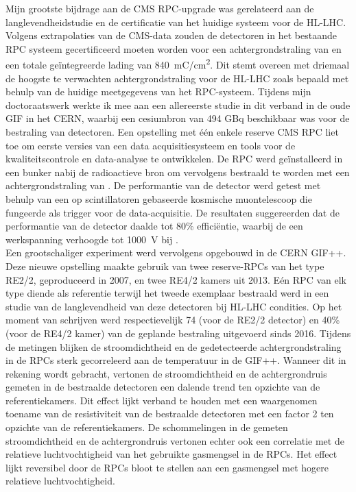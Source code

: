 	Mijn grootste bijdrage aan de CMS RPC-upgrade was gerelateerd aan de langlevendheidstudie en de certificatie van het huidige systeem voor de HL-LHC. Volgens extrapolaties van de CMS-data zouden de detectoren in het bestaande RPC systeem gecertificeerd moeten worden voor een achtergrondstraling van  en een totale geïntegreerde lading van \SI{840}{mC/cm^2}. Dit stemt overeen met driemaal de hoogste te verwachten achtergrondstraling voor de HL-LHC zoals bepaald met behulp van de huidige meetgegevens van het RPC-systeem. Tijdens mijn doctoraatswerk werkte ik mee aan een allereerste studie in dit verband in de oude GIF in het CERN, waarbij een cesiumbron van 494 GBq beschikbaar was voor de bestraling van detectoren. Een opstelling met \'e\'en enkele reserve CMS RPC liet toe om eerste versies van een data acquisitiesysteem en tools voor de kwaliteitscontrole en data-analyse te ontwikkelen. De RPC werd geïnstalleerd in een bunker nabij de radioactieve bron om vervolgens bestraald te worden met een achtergrondstraling van . De performantie van de detector werd getest met behulp van een op scintillatoren gebaseerde kosmische muontelescoop die fungeerde als trigger voor de data-acquisitie. De resultaten suggereerden dat de performantie van de detector daalde tot 80\% efficiëntie, waarbij de een werkspanning verhoogde tot \SI{1000}{V} bij .\\
	Een grootschaliger experiment werd vervolgens opgebouwd in de CERN GIF++. Deze nieuwe opstelling maakte gebruik van twee reserve-RPCs van het type RE2/2, geproduceerd in 2007, en twee RE4/2 kamers uit 2013. Eén RPC van elk type diende als referentie terwijl het tweede exemplaar bestraald werd in een studie van de langlevendheid van deze detectoren bij HL-LHC condities. Op het moment van schrijven werd respectievelijk 74 (voor de RE2/2 detector) en 40\% (voor de RE4/2 kamer) van de geplande bestraling uitgevoerd sinds 2016. Tijdens de metingen blijken de stroomdichtheid en de gedetecteerde achtergrondstraling in de RPCs sterk gecorreleerd aan de temperatuur in de GIF++. Wanneer dit in rekening wordt gebracht, vertonen de stroomdichtheid en de achtergrondruis gemeten in de bestraalde detectoren een dalende trend ten opzichte van de referentiekamers. Dit effect lijkt verband te houden met een waargenomen toename van de resistiviteit van de bestraalde detectoren met een factor 2 ten opzichte van de referentiekamers. De schommelingen in de gemeten stroomdichtheid en de achtergrondruis vertonen echter ook een correlatie met de relatieve luchtvochtigheid van het gebruikte gasmengsel in de RPCs. Het effect lijkt reversibel door de RPCs bloot te stellen aan een gasmengsel met hogere relatieve luchtvochtigheid.\\
